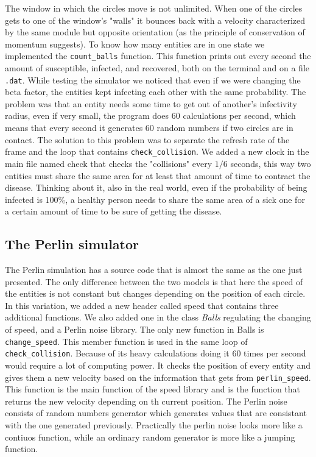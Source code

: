 The window in which the circles move is not unlimited. When one of the circles gets to one of the window's "walls" it bounces back with a velocity characterized by the same module but opposite orientation (as the principle of conservation of momentum suggests).
  To know how many entities are in one state we implemented the \verb|count_balls| function. This function prints out every second the amount of susceptible, infected, and recovered, both on the terminal and on a file \verb|.dat|.
  While testing the simulator we noticed that even if we were changing the beta factor, the entities kept infecting each other with the same probability. The problem was that an entity needs some time to get out of another's infectivity radius, even if very small, the program does 60 calculations per second, which means that every second it generates 60 random numbers if two circles are in contact. The solution to this problem was to separate the refresh rate of the frame and the loop that contains \verb|check_collision|. We added a new clock in the main file named check that checks the "collisions" every $1/6$ seconds, this way two entities must share the same area for at least that amount of time to contract the disease. Thinking about it, also in the real world, even if the probability of being infected is 100\%, a healthy person needs to share the same area of a sick one for a certain amount of time to be sure of getting the disease.

\subsection{The Perlin simulator}

  The Perlin simulation has a source code that is almost the same as the one just presented. The only difference between the two models is that here the speed of the entities is not constant but changes depending on the position of each circle. In this variation, we added a new header called speed that contains three additional functions. We also added one in the class \emph{Balls} regulating the changing of speed, and a Perlin noise library.
  The only new function in Balls is \verb|change_speed|. This member function is used in the same loop of \verb|check_collision|. Because of its heavy calculations doing it 60 times per second would require a lot of computing power. It checks the position of every entity and gives them a new velocity based on the information that gets from \verb|perlin_speed|.
  This function is the main function of the speed library and is the function that returns the new velocity depending on th current position.
  The Perlin noise consists of random numbers generator which generates values that are consistant with the one generated previously.
  Practically the perlin noise looks more like a contiuos function, while an ordinary random generator is more like a jumping function.

